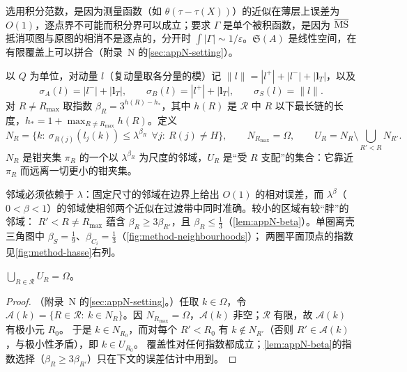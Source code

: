选用积分范数，是因为测量函数（如 $\theta(\tau-\tau(X))$）的近似在薄层上误差为 $O(1)$，逐点界不可能而积分界可以成立；要求 $\Gamma$ 是单个被积函数，是因为
$\overline{\rm MS}$ 抵消项图与原图的相消不是逐点的，分开时 $\int|\Gamma|\sim1/\varepsilon$。$\mathfrak S(A)$ 是线性空间，在有限覆盖上可以拼合（附录~N 的\cref{sec:appN-setting}）。

\begin{definition}\label{def:method-neighbourhoods}
以 $Q$ 为单位，对动量 $l$（复动量取各分量的模）记 $\|l\|=|l^+|+|l^-|+|\mathbf l_T|$，以及
\begin{equation}\label{eq:method-sigma}
\sigma_A(l)=|l^-|+|\mathbf l_T|,\qquad \sigma_B(l)=|l^+|+|\mathbf l_T|,\qquad \sigma_S(l)=\|l\| .
\end{equation}
对 $R\neq R_{\max}$ 取指数 $\beta_R=3^{h(R)-h_*}$，其中 $h(R)$ 是 $\mathcal R$ 中 $R$ 以下最长链的长度，$h_*=1+\max_{R\ne R_{\max}}h(R)$。定义
\begin{equation}\label{eq:method-NU}
N_R=\bigl\{k:\ \sigma_{R(j)}(l_j(k))\le\lambda^{\beta_R}\ \ \forall j:\ R(j)\neq H\bigr\},\qquad N_{R_{\max}}=\Omega,\qquad U_R=N_R\setminus\bigcup_{R'<R}N_{R'} .
\end{equation}
$N_R$ 是钳夹集 $\pi_R$ 的一个以 $\lambda^{\beta_R}$ 为尺度的邻域，$U_R$ 是“受 $R$ 支配”的集合：它靠近 $\pi_R$ 而远离一切更小的钳夹集。
\end{definition}

邻域必须依赖于 $\lambda$：固定尺寸的邻域在边界上给出 $O(1)$ 的相对误差，而 $\lambda^\beta$（$0<\beta<1$）的邻域使相邻两个近似在过渡带中同时准确。较小的区域有较“胖”的邻域：
$R'<R\neq R_{\max}$ 蕴含 $\beta_R\ge3\beta_{R'}$，且 $\beta_R\le\frac13$（\cref{lem:appN-beta}）。单圈离壳三角图中 $\beta_S=\frac19$、$\beta_{C_i}=\frac13$（\cref{fig:method-neighbourhoods}）；
两圈平面顶点的指数见\cref{fig:method-hasse}右列。


\begin{lemma}[邻域覆盖]\label{lem:method-covering}
$\bigcup_{R\in\mathcal R}U_R=\Omega$。
\end{lemma}

\begin{proof}
（附录~N 的\cref{sec:appN-setting}。）任取 $k\in\Omega$，令 $\mathcal A(k)=\{R\in\mathcal R:\ k\in N_R\}$。因 $N_{R_{\max}}=\Omega$，$\mathcal A(k)$ 非空；$\mathcal R$ 有限，故 $\mathcal A(k)$ 有极小元 $R_0$。
于是 $k\in N_{R_0}$，而对每个 $R'<R_0$ 有 $k\notin N_{R'}$（否则 $R'\in\mathcal A(k)$，与极小性矛盾），即 $k\in U_{R_0}$。
覆盖性对任何指数都成立；\cref{lem:appN-beta}的指数选择（$\beta_R\ge3\beta_{R'}$）只在下文的误差估计中用到。
\end{proof}

